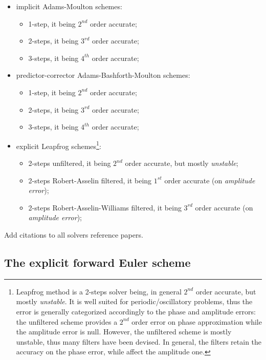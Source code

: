 \begin{itemize}
\begin{itemize}
\begin{itemize}
          \end{itemize}
      \item implicit Adams-Moulton schemes:
        \begin{itemize}
          \item 1-step, it being $2^{nd}$ order accurate;
          \item 2-steps, it being $3^{rd}$ order accurate;
          \item 3-steps, it being $4^{th}$ order accurate;
          \end{itemize}
      \item predictor-corrector Adams-Bashforth-Moulton schemes:
        \begin{itemize}
          \item 1-step, it being $2^{nd}$ order accurate;
          \item 2-steps, it being $3^{rd}$ order accurate;
          \item 3-steps, it being $4^{th}$ order accurate;
          \end{itemize}
      \item explicit Leapfrog schemes\footnote{Leapfrog method is a 2-steps solver being, in general $2^{nd}$ order accurate, but mostly \emph{unstable}. It is well suited for periodic/oscillatory problems, thus the error is generally categorized accordingly to the phase and amplitude errors: the unfiltered scheme provides a $2^{nd}$ order error on phase approximation while the amplitude error is null. However, the unfiltered scheme is mostly unstable, thus many filters have been devised. In general, the filters retain the accuracy on the phase error, while affect the amplitude one.}:
        \begin{itemize}
          \item 2-steps unfiltered, it being $2^{nd}$ order accurate, but mostly \emph{unstable};
          \item 2-steps Robert-Asselin filtered, it being $1^{st}$ order accurate (on \emph{amplitude error});
          \item 2-steps Robert-Asselin-Williams filtered, it being $3^{rd}$ order accurate (on \emph{amplitude error});
          \end{itemize}
      \end{itemize}
  \end{itemize}

{\color{red} Add citations to all solvers reference papers.}

\subsection{The explicit forward Euler scheme}

